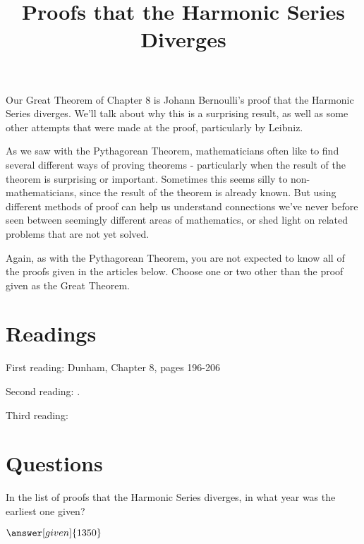 \documentclass[nooutcomes]{ximera}
\title{Proofs that the Harmonic Series Diverges}
\begin{document}
\begin{abstract}
    
\end{abstract}
\maketitle

Our Great Theorem of Chapter 8 is Johann Bernoulli's proof that the Harmonic Series diverges.  We'll talk about why this is a surprising result, as well as some other attempts that were made at the proof, particularly by Leibniz.  

As we saw with the Pythagorean Theorem, mathematicians often like to find several different ways of proving theorems - particularly when the result of the theorem is surprising or important.  Sometimes this seems silly to non-mathematicians, since the result of the theorem is already known.  But using different methods of proof can help us understand connections we've never before seen between seemingly different areas of mathematics, or shed light on related problems that are not yet solved.

Again, as with the Pythagorean Theorem, you are not expected to know all of the proofs given in the articles below.  Choose one or two other than the proof given as the Great Theorem.



\section{Readings}
First reading: Dunham, Chapter 8, pages 196-206

Second reading: .

Third reading: 



\section{Questions}
In the list of proofs that the Harmonic Series diverges, in what year was the earliest one given?
\begin{question}

$\answer[given]{1350}$
\end{question}
\end{document}
